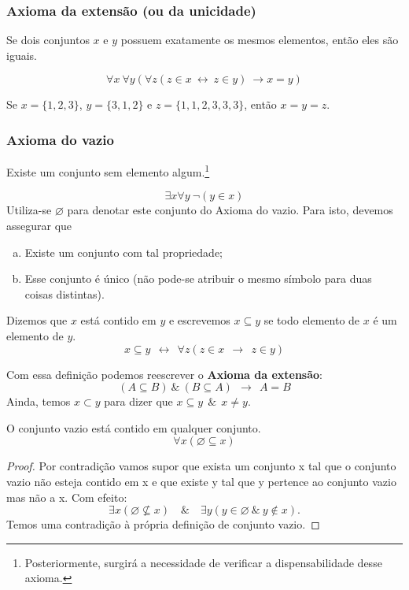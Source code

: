       \subsubsection{Axioma da extensão (ou da unicidade)}
         \begin{stat}
            Se dois conjuntos $x$ e $y$ possuem exatamente os mesmos elementos, então eles são iguais.
         \end{stat}
         $$\forall x\ \forall y (\forall z (z \in x\ \leftrightarrow \ z \in y)\ \rightarrow x = y)$$
         \begin{exmp}
            Se $x = \{1, 2, 3\}$, $y = \{3,1,2\}$ e $z = \{1,1,2,3,3,3\}$, então $x = y = z$.
         \end{exmp}
         
      \subsubsection{Axioma do vazio}
         \begin{stat}
            Existe um conjunto sem elemento algum.\footnote{Posteriormente, surgirá a necessidade de verificar a dispensabilidade desse axioma.}
         \end{stat}    
         $$\exists x \forall y\ \neg(y \in x)$$
         Utiliza-se $\varnothing$ para denotar este conjunto do Axioma do vazio. Para isto, devemos assegurar que
         \begin{enumerate}[a.]
            \item Existe um conjunto com tal propriedade;
            \item Esse conjunto é único (não pode-se atribuir o mesmo símbolo para duas coisas distintas).
         \end{enumerate}
         \begin{definition}
            Dizemos que $x$ está contido em $y$ e escrevemos $x \subseteq y$ se todo elemento de $x$ é um elemento de $y$. 
            $$ x \subseteq y\ \ \leftrightarrow\ \ \forall z (z \in x\ \ \rightarrow\ \ z \in y)$$
         \end{definition}
         Com essa definição podemos reescrever o \textbf{Axioma da extensão}: $$(A \subseteq B)\ \&\ (B \subseteq A)\ \ \rightarrow\ \ A = B$$
         Ainda, temos $x \subset y$ para dizer que $x \subseteq y\ \ \&\ \ x \neq y$.
         \begin{theorem}\label{T1}
            O conjunto vazio está contido em qualquer conjunto.
            $$\forall x (\varnothing \subseteq x)$$
            \begin{proof}
               Por contradição vamos supor que exista um conjunto x tal que o conjunto vazio não esteja contido em x e que existe y tal que y pertence ao conjunto vazio mas não a x. Com efeito:
               $$\exists x(\varnothing \nsubseteq x)\quad \&\quad \exists y(y \in \varnothing\ \&\ y \notin x).$$
               Temos uma contradição à própria definição de conjunto vazio.
            \end{proof}
         \end{theorem}
